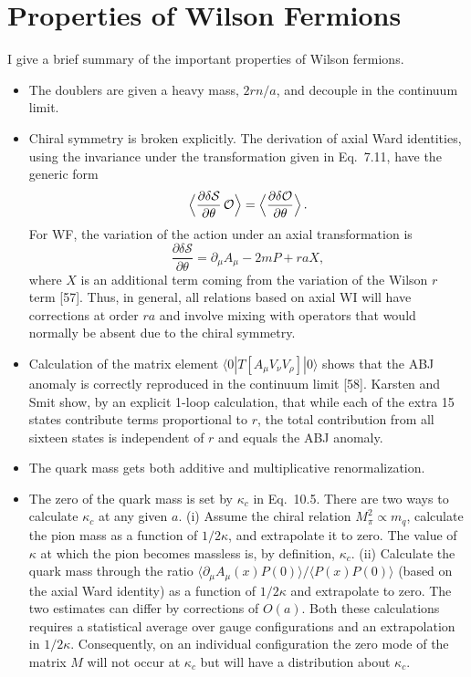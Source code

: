 \section{Properties of Wilson Fermions}

I give a brief summary of the important properties of Wilson fermions.

\begin{itemize}
\item The doublers are given a heavy mass, $2 r n /a$, and decouple in the
continuum limit.

\item Chiral symmetry is broken explicitly.  The derivation of axial Ward
identities, using the invariance under the transformation given in Eq.~7.11,
have the generic form
\begin{equation}
\Bigl\langle \frac{\partial \delta\mathcal{S}}{\partial \theta}\,\mathcal{O} \Bigr\rangle = \Bigl\langle \frac{\partial \delta\mathcal{O}}{\partial \theta} \Bigr\rangle \,.
\end{equation}
For WF, the variation of the action under an axial transformation is
\begin{equation}
\frac{\partial \delta\mathcal{S}}{\partial \theta} = \partial_\mu A_\mu - 2 m P + r a X,
\end{equation}
where $X$ is an additional term coming from the variation of the Wilson $r$
term [57].  Thus, in general, all relations based on axial WI will have
corrections at order $ra$ and involve mixing with operators that would normally
be absent due to the chiral symmetry.

\item Calculation of the matrix element $\langle 0| T[A_\mu V_\nu V_\rho] |0\rangle$
shows that the ABJ anomaly is correctly reproduced in the continuum
limit [58].  Karsten and Smit show, by an explicit 1-loop calculation, that
while each of the extra 15 states contribute terms proportional to $r$, the
total contribution from all sixteen states is independent of $r$ and equals the
ABJ anomaly.

\item The quark mass gets both additive and multiplicative renormalization.

\item The zero of the quark mass is set by $\kappa_c$ in Eq.~10.5.  There are
two ways to calculate $\kappa_c$ at any given $a$.  (i) Assume the chiral
relation $M_\pi^2 \propto m_q$, calculate the pion mass as a function of
$1/2\kappa$, and extrapolate it to zero.  The value of $\kappa$ at which the
pion becomes massless is, by definition, $\kappa_c$.  (ii) Calculate the quark
mass through the ratio $\langle \partial_\mu A_\mu(x) P(0)\rangle / \langle
P(x) P(0)\rangle$ (based on the axial Ward identity) as a function of
$1/2\kappa$ and extrapolate to zero.  The two estimates can differ by
corrections of $O(a)$.  Both these calculations requires a statistical average
over gauge configurations and an extrapolation in $1/2\kappa$.  Consequently,
on an individual configuration the zero mode of the matrix $M$ will not occur
at $\kappa_c$ but will have a distribution about $\kappa_c$.


\end{itemize}
